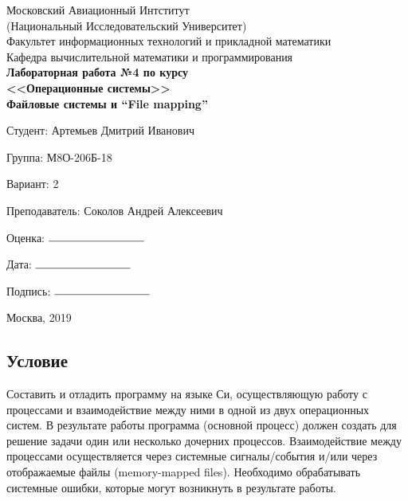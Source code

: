 \documentclass[12pt]{article}
\begin{document}
\begin{titlepage}
  \large
  \begin{center} 
    
      Московский Авиационный Интститут \\
      (Национальный Исследовательский Университет) \\
      Факультет информационных технологий и прикладной математики \\
      Кафедра вычислительной математики и программирования \\
      \vfill\vfill
      \textbf{
        { Лабораторная работа №4 по курсу} \\ 
        <<Операционные системы>> \\
        \bigskip
            {Файловые системы и ``File mapping'' } \\
    } 
  \end{center}
  \vfill

  \begin{flushright}

    Студент:  {Артемьев Дмитрий Иванович}

    Группа: {М8О-206Б-18}

    Вариант: {2}
    
    Преподаватель: {Соколов Андрей Алексеевич}

    Оценка: $\rule{3cm}{0.15mm}$

    Дата: $\rule{3cm}{0.15mm}$
    
    Подпись: $\rule{3cm}{0.15mm}$

  \end{flushright}
  \vfill
  \begin{center}
    Москва, 2019
  \end{center}
  
\end{titlepage}

\subsection*{Условие}

Составить и отладить программу на языке Си, осуществляющую работу с процессами и
взаимодействие между ними в одной из двух операционных систем. В результате работы
программа (основной процесс) должен создать для решение задачи один или несколько
дочерних процессов. Взаимодействие между процессами осуществляется через системные
сигналы/события и/или через отображаемые файлы (memory-mapped files).
Необходимо обрабатывать системные ошибки, которые могут возникнуть в результате работы.
\end{document}
